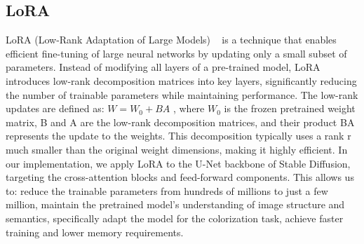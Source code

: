 \documentclass[10pt,twocolumn,letterpaper]{article}
\begin{document}
\subsection{LoRA}
LoRA (Low-Rank Adaptation of Large Models)  ~\cite{LoRA} is a technique that enables efficient fine-tuning of large neural networks by updating only a small subset of parameters. Instead of modifying all layers of a pre-trained model, LoRA introduces low-rank decomposition matrices into key layers, significantly reducing the number of trainable parameters while maintaining performance. 
The low-rank updates are defined as: \begin{math}
W = W_0 + BA
\end{math}
, where \begin{math}W_0 \end{math} is the frozen pretrained weight matrix, B and A are the low-rank decomposition matrices, and their product BA represents the update to the weights. This decomposition typically uses a rank r much smaller than the original weight dimensions, making it highly efficient. 
In our implementation, we apply LoRA to the U-Net backbone of Stable Diffusion, targeting the cross-attention blocks and feed-forward components. This allows us to: reduce the trainable parameters from hundreds of millions to just a few million, maintain the pretrained model's understanding of image structure and semantics, specifically adapt the model for the colorization task, achieve faster training and lower memory requirements. 
\end{document}
